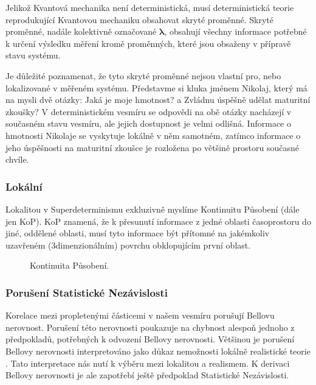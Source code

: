 Jelikož Kvantová mechanika není deterministická, musí deterministická teorie reprodukující Kvantovou mechaniku obsahovat skryté proměnné. Skryté proměnné, nadále kolektivně označované $\bm{\lambda}$, obsahují všechny informace potřebné k určení výsledku měření kromě  proměnných, které jsou obsaženy v přípravě stavu systému.

Je důležité poznamenat, že tyto skryté proměnné nejsou vlastní pro, nebo lokalizované v měřeném systému. Představme si kluka jménem Nikolaj, který má na mysli dvě otázky: Jaká je moje hmotnost? a Zvládnu úspěšně udělat maturitní zkoušky? V deterministickém vesmíru se odpovědi na obě otázky nacházejí v současném stavu vesmíru, ale jejich dostupnost je velmi odlišná. Informace o hmotnosti Nikolaje se vyskytuje lokálně v něm samotném, zatímco informace o jeho úspěšnosti na maturitní zkoušce je rozložena po většině prostoru současné chvíle.

\subsubsection{Lokální} Lokalitou v Superdeterminismu exkluzivně myslíme Kontinuitu Působení (dále jen KoP). KoP znamená, že k přesunutí informace z jedné oblasti časoprostoru do jiné, oddělené oblasti, musí tyto informace být přítomné na jakémkoliv uzavřeném (3dimenzionálním) povrchu obklopujícím první oblast.


\begin{figure}[ht]

    \centering

    \caption{\label{fig:7}Kontinuita Působení.}
\end{figure}


\subsubsection{Porušení Statistické Nezávislosti}
Korelace mezi propletenými částicemi v našem vesmíru porušují Bellovu nerovnost. Porušení této nerovnosti poukazuje na chybnost alespoň jednoho z předpokladů, potřebných k odvození Bellovy nerovnosti. Většinou je porušení Bellovy nerovnosti interpretováno jako důkaz nemožnosti lokálně realistické teorie \parencite{belltest:violation}. Tato interpretace nás nutí k výběru mezi lokalitou a realismem. K derivaci Bellovy nerovnosti je ale zapotřebí ještě předpoklad Statistické Nezávislosti.